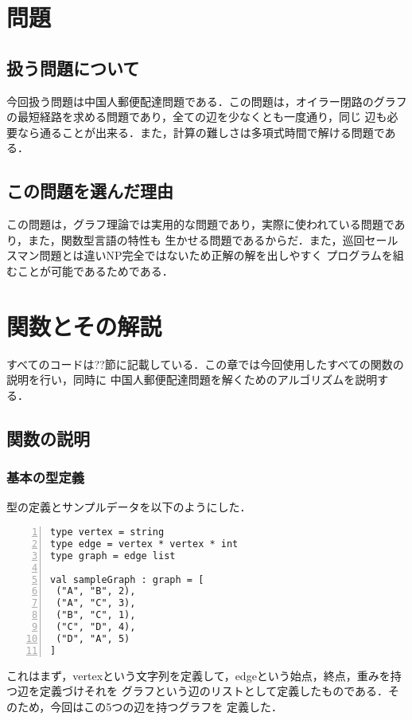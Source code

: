 


\section{問題} \label{sec:abstract}
\subsection{扱う問題について}
今回扱う問題は中国人郵便配達問題である．この問題は，オイラー閉路のグラフの最短経路を求める問題であり，全ての辺を少なくとも一度通り，同じ
辺も必要なら通ることが出来る．また，計算の難しさは多項式時間で解ける問題である．
\subsection{この問題を選んだ理由}
この問題は，グラフ理論では実用的な問題であり，実際に使われている問題であり，また，関数型言語の特性も
生かせる問題であるからだ．また，巡回セールスマン問題とは違いNP完全ではないため正解の解を出しやすく
プログラムを組むことが可能であるためである．

\section{関数とその解説} \label{sec:absatract}
すべてのコードは??節に記載している．この章では今回使用したすべての関数の説明を行い，同時に
中国人郵便配達問題を解くためのアルゴリズムを説明する．
\subsection{関数の説明}
\subsubsection{基本の型定義}
型の定義とサンプルデータを以下のようにした．
\begin{Verbatim}[numbers=left, xleftmargin=10mm, numbersep=6pt,
fontsize=\small, baselinestretch=0.8]
type vertex = string
type edge = vertex * vertex * int
type graph = edge list

val sampleGraph : graph = [
 ("A", "B", 2),
 ("A", "C", 3),
 ("B", "C", 1),
 ("C", "D", 4),
 ("D", "A", 5)
]
\end{Verbatim}
これはまず，vertexという文字列を定義して，edgeという始点，終点，重みを持つ辺を定義づけそれを
グラフという辺のリストとして定義したものである．そのため，今回はこの5つの辺を持つグラフを
定義した．

